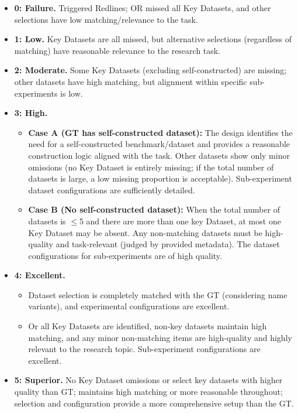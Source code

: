\begin{tcolorbox}[
	title={Box 7: Full Evaluation Prompt},
	colback=blue!3!white,
	colframe=blue!30!black,
	colbacktitle=blue!15!white,
	coltitle=black,
	fonttitle=\bfseries,
	arc=3mm,
	boxrule=0.8pt,
	breakable
]
\begin{itemize}[nosep,leftmargin=12pt]
	\item \textbf{0: Failure.} Triggered Redlines; OR missed all Key Datasets, and other selections have low matching/relevance to the task.
	\item \textbf{1: Low.} Key Datasets are all missed, but alternative selections (regardless of matching) have reasonable relevance to the research task.
	\item \textbf{2: Moderate.} Some Key Datasets (excluding self-constructed) are missing; other datasets have high matching, but alignment within specific sub-experiments is low.
	\item \textbf{3: High.}
	\begin{itemize}[nosep,leftmargin=16pt]
		\item \textbf{Case A (GT has self-constructed dataset):} The design identifies the need for a self-constructed benchmark/dataset and provides a reasonable construction logic aligned with the task. Other datasets show only minor omissions (no Key Dataset is entirely missing; if the total number of datasets is large, a low missing proportion is acceptable). Sub-experiment dataset configurations are sufficiently detailed.
		\item \textbf{Case B (No self-constructed dataset):} When the total number of datasets is $\leq$5 and there are more than one key Dataset, at most one Key Dataset may be absent. Any non-matching datasets must be high-quality and task-relevant (judged by provided metadata). The dataset configurations for sub-experiments are of high quality.
	\end{itemize}
	\item \textbf{4: Excellent.}
	\begin{itemize}[nosep,leftmargin=16pt]
		\item Dataset selection is completely matched with the GT (considering name variants), and experimental configurations are excellent.
		\item Or all Key Datasets are identified, non-key datasets maintain high matching, and any minor non-matching items are high-quality and highly relevant to the research topic. Sub-experiment configurations are excellent.
	\end{itemize}
	\item \textbf{5: Superior.} No Key Dataset omissions or select key datasets with higher quality than GT; maintains high matching or more reasonable throughout; selection and configuration provide a more comprehensive setup than the GT.
\end{itemize}


\end{tcolorbox}
